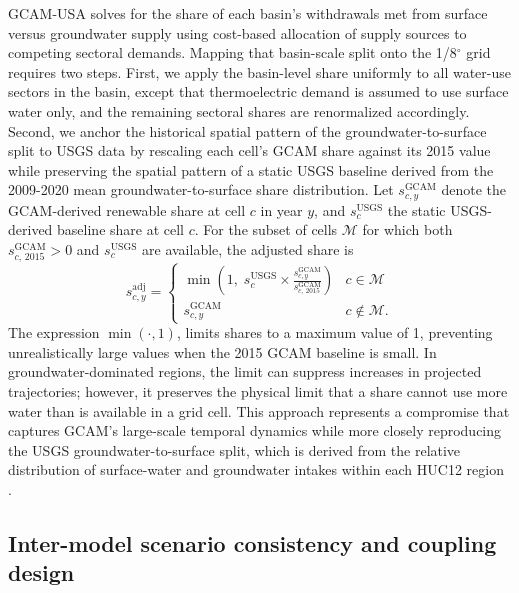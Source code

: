 \documentclass[fleqn,10pt]{wlscirep}
\begin{document}
GCAM-USA solves for the share of each basin's withdrawals met from surface versus groundwater supply using cost-based allocation of supply sources to competing sectoral demands. Mapping that basin-scale split onto the 1/8$^{\circ}$ grid requires two steps. First, we apply the basin-level share uniformly to all water-use sectors in the basin, except that thermoelectric demand is assumed to use surface water only, and the remaining sectoral shares are renormalized accordingly. Second, we anchor the historical spatial pattern of the groundwater-to-surface split to USGS data by rescaling each cell's GCAM share against its 2015 value while preserving the spatial pattern of a static USGS baseline derived from the 2009-2020 mean groundwater-to-surface share distribution\cite{Stets2025USGS}. Let $s^{\mathrm{GCAM}}_{c,y}$ denote the GCAM-derived renewable share at cell $c$ in year $y$, and $s^{\mathrm{USGS}}_c$ the static USGS-derived baseline share at cell $c$. For the subset of cells $\mathcal{M}$ for which both $s^{\mathrm{GCAM}}_{c,\,2015}>0$ and $s^{\mathrm{USGS}}_c$ are available, the adjusted share is
\begin{equation}
s^{\mathrm{adj}}_{c,y} =
\begin{cases}
\displaystyle \min\!\left(1,\; s^{\mathrm{USGS}}_c \times \frac{s^{\mathrm{GCAM}}_{c,y}}{s^{\mathrm{GCAM}}_{c,\,2015}}\right) & c \in \mathcal{M} \\[10pt]
s^{\mathrm{GCAM}}_{c,y}                                                                                        & c \notin \mathcal{M}.
\end{cases}
\label{eq:source-shares}
\end{equation}
The expression $\min(\cdot,1)$, limits shares to a maximum value of 1, preventing unrealistically large values when the 2015 GCAM baseline is small. In groundwater-dominated regions, the limit can suppress increases in projected trajectories; however, it preserves the physical limit that a share cannot use more water than is available in a grid cell. This approach represents a compromise that captures GCAM's large-scale temporal dynamics while more closely reproducing the USGS groundwater-to-surface split, which is derived from the relative distribution of surface-water and groundwater intakes within each HUC12 region \cite{Stets2025USGS}.

\subsection*{Inter-model scenario consistency and coupling design}
\end{document}
